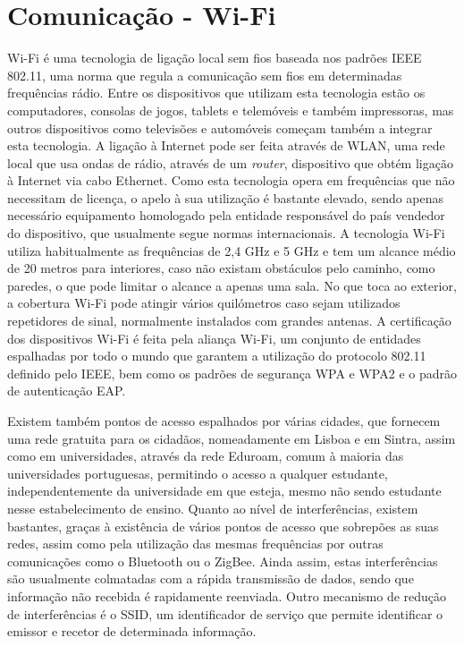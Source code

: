 \section{Comunicação - Wi-Fi}
\label{sec:wi-fi}

Wi-Fi é uma tecnologia de ligação local sem fios baseada nos padrões IEEE 802.11, uma norma que regula a comunicação sem fios em determinadas frequências rádio.
Entre os dispositivos que utilizam esta tecnologia estão os computadores, consolas de jogos, tablets e telemóveis e também impressoras, mas outros dispositivos como televisões e automóveis começam também a integrar esta tecnologia.
A ligação à Internet pode ser feita através de WLAN, uma rede local que usa ondas de rádio, através de um \emph{router}, dispositivo que obtém ligação à Internet via cabo Ethernet.
Como esta tecnologia opera em frequências que não necessitam de licença, o apelo à sua utilização é bastante elevado, sendo apenas necessário equipamento homologado pela entidade responsável do país vendedor do dispositivo, que usualmente segue normas internacionais.
A tecnologia Wi-Fi utiliza habitualmente as frequências de 2,4 GHz e 5 GHz e tem um alcance médio de 20 metros para interiores, caso não existam obstáculos pelo caminho, como paredes, o que pode limitar o alcance a apenas uma sala.
No que toca ao exterior, a cobertura Wi-Fi pode atingir vários quilómetros caso sejam utilizados repetidores de sinal, normalmente instalados com grandes antenas.
A certificação dos dispositivos Wi-Fi é feita pela aliança Wi-Fi, um conjunto de entidades espalhadas por todo o mundo que garantem a utilização do protocolo 802.11 definido pelo IEEE, bem como os padrões de segurança WPA e WPA2 e o padrão de autenticação EAP.

Existem também pontos de acesso espalhados por várias cidades, que fornecem uma rede gratuita para os cidadãos, nomeadamente em Lisboa e em Sintra, assim como em universidades, através da rede Eduroam, comum à maioria das universidades portuguesas, permitindo o acesso a qualquer estudante, independentemente da universidade em que esteja, mesmo não sendo estudante nesse estabelecimento de ensino.
Quanto ao nível de interferências, existem bastantes, graças à existência de vários pontos de acesso que sobrepões as suas redes, assim como pela utilização das mesmas frequências por outras comunicações como o Bluetooth ou o ZigBee.
Ainda assim, estas interferências são usualmente colmatadas com a rápida transmissão de dados, sendo que informação não recebida é rapidamente reenviada.
Outro mecanismo de redução de interferências é o SSID, um identificador de serviço que permite identificar o emissor e recetor de determinada informação.

